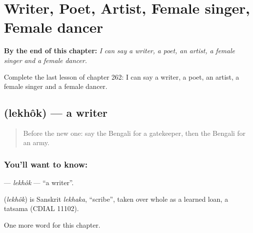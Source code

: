 
\chapter{Writer, Poet, Artist, Female singer, Female dancer}
\label{ch:bn-writer-poet-artist-female-singer-female-dancer}

\begin{chapteropening}
\textbf{By the end of this chapter:} \emph{I can say a writer, a poet, an artist, a female singer and a female dancer.}

Complete the last lesson of chapter 262: I can say a writer, a poet, an artist, a female singer and a female dancer.
\end{chapteropening}

\section[\texorpdfstring{\bn{লেখক} (lekhôk)}{লেখক (lekhôk)}]{ (lekhôk) — a writer}

\label{lesson:BN-C262-lekhok}



\begin{quote}
Before the new one: say the Bengali for a gatekeeper, then the Bengali for an army.
\end{quote}

\subsection*{You'll want to know: }
\textbf{} — \emph{lekhôk} — \textquotedblleft{}a writer\textquotedblright{}.

\begin{cousinweb}
\textbf{} (\emph{lekhôk}) is Sanskrit \emph{lekhaka}, \textquotedblleft{}scribe\textquotedblright{}, taken over whole as a learned loan, a tatsama (CDIAL 11102).
\end{cousinweb}

\begin{grammarlens}[title={What you've built}]
One more word for this chapter.
\end{grammarlens}

